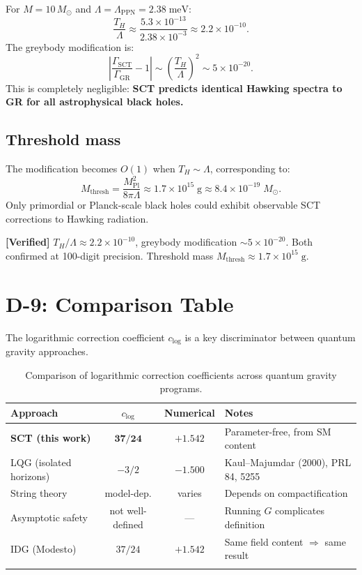 \documentclass[11pt,a4paper]{article}
\newcommand{\MP}{M_{\mathrm{Pl}}}
\theoremstyle{plain}
\theoremstyle{definition}
\newcommand{\verified}[1]{%
  \par\smallskip\noindent
  \colorbox{green!10}{\parbox{\dimexpr\linewidth-2\fboxsep}{%
    \textcolor{green!50!black}{\textbf{[Verified]}} #1}}%
  \par\smallskip}
\begin{document}
For $M = 10\,M_\odot$ and $\Lambda = \Lambda_{\mathrm{PPN}} = 2.38\;\mathrm{meV}$:
\begin{equation}
  \frac{T_H}{\Lambda} \approx \frac{5.3\times 10^{-13}}{2.38\times 10^{-3}}
  \approx 2.2 \times 10^{-10}.
\end{equation}
The greybody modification is:
\begin{equation}
  \left|\frac{\Gamma_{\mathrm{SCT}}}{\Gamma_{\mathrm{GR}}} - 1\right|
  \sim \left(\frac{T_H}{\Lambda}\right)^2 \sim 5 \times 10^{-20}.
\end{equation}
This is completely negligible: \textbf{SCT predicts identical Hawking
spectra to GR for all astrophysical black holes.}

\subsection{Threshold mass}

The modification becomes $O(1)$ when $T_H \sim \Lambda$, corresponding to:
\begin{equation}\label{eq:M-thresh}
  M_{\mathrm{thresh}} = \frac{\MP^2}{8\pi\Lambda}
  \approx 1.7 \times 10^{15}\;\mathrm{g}
  \approx 8.4 \times 10^{-19}\;M_\odot.
\end{equation}
Only primordial or Planck-scale black holes could exhibit observable
SCT corrections to Hawking radiation.

\verified{$T_H/\Lambda \approx 2.2\times 10^{-10}$, greybody modification
$\sim 5\times 10^{-20}$. Both confirmed at 100-digit precision.
Threshold mass $M_{\mathrm{thresh}} \approx 1.7\times 10^{15}\;\mathrm{g}$.}


\section{D-9: Comparison Table}
\label{sec:D9}

The logarithmic correction coefficient $c_{\log}$ is a key
discriminator between quantum gravity approaches.

\begin{center}
\begin{longtable}{lccl}
\toprule
Approach & $c_{\log}$ & Numerical & Notes \\
\midrule
\endhead
\textbf{SCT (this work)} & $\mathbf{37/24}$ & $\mathbf{+1.542}$ &
  Parameter-free, from SM content \\
LQG (isolated horizons) & $-3/2$ & $-1.500$ &
  Kaul--Majumdar (2000), PRL 84, 5255 \\
String theory & model-dep. & varies &
  Depends on compactification \\
Asymptotic safety & not well-defined & --- &
  Running $G$ complicates definition \\
IDG (Modesto) & $37/24$ & $+1.542$ &
  Same field content $\Rightarrow$ same result \\
\bottomrule
\caption{Comparison of logarithmic correction coefficients across
  quantum gravity programs.}
\label{tab:comparison}
\end{longtable}
\end{center}
\end{document}
